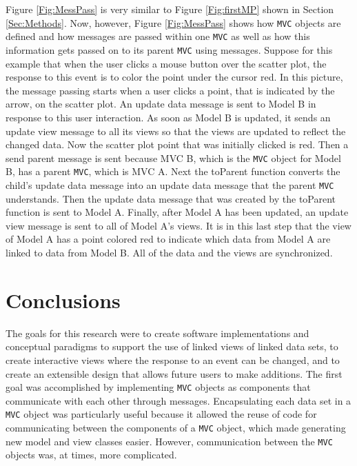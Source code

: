 \documentclass{article}[11pt]
\newcommand{\Rfunction}[1]{{\textsf{#1}}}
\newcommand{\Robject}[1]{{\texttt{#1}}}
\begin{document}
Figure \ref{Fig:MessPass} is very similar to Figure \ref{Fig:firstMP} shown in
Section \ref{Sec:Methods}.  Now, however, Figure \ref{Fig:MessPass} shows how
\Robject{MVC} objects are defined and how messages are passed within one
\Robject{MVC} as well as how this information gets passed on to its parent
\Robject{MVC} using messages.  Suppose for this example that when the user
clicks a mouse button over the scatter plot, the response to this event is to
color the point under the cursor 
red.  In this picture, the message passing starts when a user clicks a point,
that is indicated by the arrow, on the scatter plot.  An update data message is
sent to Model B in response to this user interaction.  As soon as Model B is
updated, it sends an update view message to all its views so that the views
are updated to reflect the changed data.  Now the scatter plot point that was
initially clicked is red.  Then a send parent message is sent because MVC
B, which is the \Robject{MVC} object for Model B, has a parent \Robject{MVC},
which is MVC A.  Next the \Rfunction{toParent} function converts the child's
update data message into an update data message that the parent \Robject{MVC}
understands.  Then the update data message that was created by the
\Rfunction{toParent} function is sent to Model A.  Finally, after Model A has
been updated, an update view message is sent to all of Model A's views.  It is
in this last step that the view of Model A has a point colored red to indicate
which data from Model A are linked to data from Model B.  All of the data and
the views are synchronized. 

\section{Conclusions}
\label{Sec:Conc}

The goals for this research were to create software implementations and
conceptual paradigms to support the use of linked views of linked data sets,
to create interactive views where the response to an event can be changed, and
to create an extensible design that allows future users to make additions.
The first goal was accomplished by implementing \Robject{MVC} objects as
components that communicate with each other through messages.  Encapsulating
each data set in a \Robject{MVC} object was particularly useful because it
allowed the reuse of code for communicating between the components of a
\Robject{MVC} object, which made generating new model and view classes easier.
However, communication between the \Robject{MVC} objects was, at times, more
complicated. 
\end{document}
